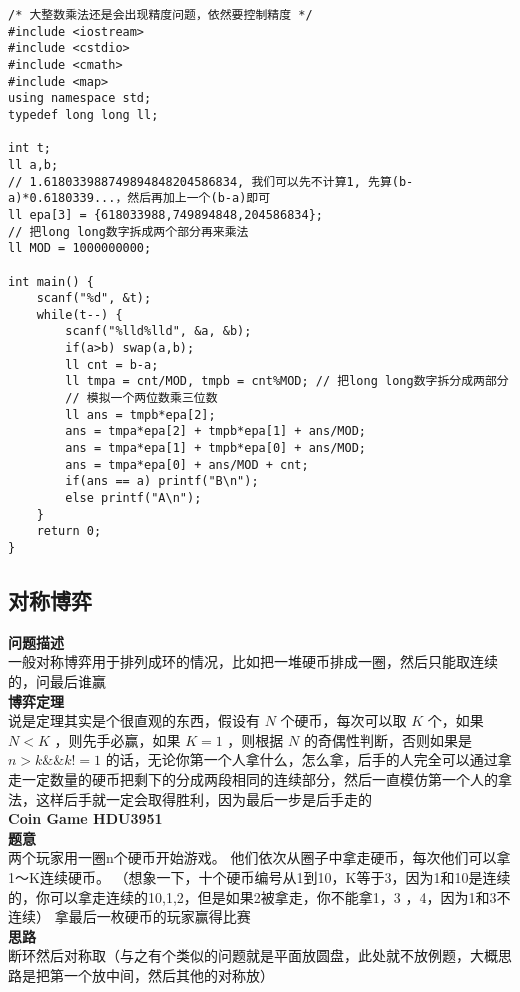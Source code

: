\begin{lstlisting}
/* 大整数乘法还是会出现精度问题，依然要控制精度 */
#include <iostream>
#include <cstdio>
#include <cmath>
#include <map>
using namespace std;
typedef long long ll;

int t;
ll a,b; 
// 1.618033988749894848204586834, 我们可以先不计算1, 先算(b-a)*0.6180339...，然后再加上一个(b-a)即可
ll epa[3] = {618033988,749894848,204586834}; 
// 把long long数字拆成两个部分再来乘法 
ll MOD = 1000000000;

int main() {
	scanf("%d", &t);
	while(t--) {
		scanf("%lld%lld", &a, &b);
		if(a>b) swap(a,b);
		ll cnt = b-a;
		ll tmpa = cnt/MOD, tmpb = cnt%MOD; // 把long long数字拆分成两部分 
		// 模拟一个两位数乘三位数 
		ll ans = tmpb*epa[2];
		ans = tmpa*epa[2] + tmpb*epa[1] + ans/MOD;
		ans = tmpa*epa[1] + tmpb*epa[0] + ans/MOD;
		ans = tmpa*epa[0] + ans/MOD + cnt;
		if(ans == a) printf("B\n");
		else printf("A\n");
	}
	return 0;
}
\end{lstlisting}

\subsection{对称博弈}
\textbf{问题描述}\\
一般对称博弈用于排列成环的情况，比如把一堆硬币排成一圈，然后只能取连续的，问最后谁赢\\
\textbf{博弈定理}\\
说是定理其实是个很直观的东西，假设有 $N$ 个硬币，每次可以取 $K$ 个，如果$N < K$ ，则先手必赢，如果 $K=1$ ，则根据 $N$ 的奇偶性判断，否则如果是 $n>k \&\& k!=1$ 的话，无论你第一个人拿什么，怎么拿，后手的人完全可以通过拿走一定数量的硬币把剩下的分成两段相同的连续部分，然后一直模仿第一个人的拿法，这样后手就一定会取得胜利，因为最后一步是后手走的\\

\textbf{Coin Game HDU3951}\\
\textbf{题意}\\
两个玩家用一圈n个硬币开始游戏。 他们依次从圈子中拿走硬币，每次他们可以拿1〜K连续硬币。 （想象一下，十个硬币编号从1到10，K等于3，因为1和10是连续的，你可以拿走连续的10,1,2，但是如果2被拿走，你不能拿1，3 ，4，因为1和3不连续） 拿最后一枚硬币的玩家赢得比赛\\

\textbf{思路}\\
断环然后对称取（与之有个类似的问题就是平面放圆盘，此处就不放例题，大概思路是把第一个放中间，然后其他的对称放）\\

